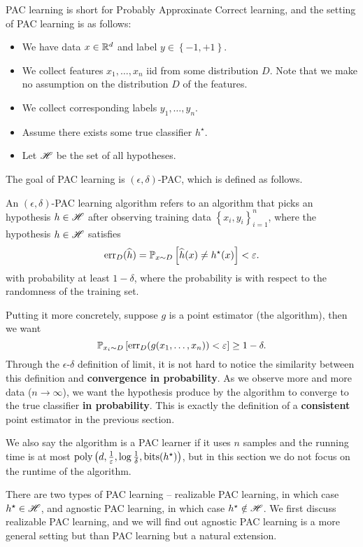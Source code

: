\documentclass[a4paper]{article}
\begin{document}
PAC learning is short for Probably Approxinate Correct 
learning, and the setting of PAC learning is as follows:
\begin{itemize}
  \item We have data $x \in \mathbb{R}^d$ and label $y \in \left\{ -1, 
  +1 \right\}$. 
  \item We collect features $x_1, \dots, x_n$ iid from 
  some distribution $D$. Note that we make no assumption on 
  the distribution $D$ of the features. 
  \item We collect corresponding labels $y_1, \dots, y_n$. 
  \item Assume there exists some true classifier $h^\star$.
  \item Let $\mathscr{H}$ be the set of all hypotheses.
\end{itemize}
The goal of PAC learning is $(\epsilon, \delta)$-PAC, 
which is defined as follows. 
\begin{defi}
  An $(\epsilon, \delta)$-PAC learning algorithm
  refers to an algorithm that 
  picks an hypothesis $h \in \mathscr{H}$  
  after observing training data 
  $\left\{ x_i, y_i \right\}_{i=1}^n$,
  where the hypothesis $h \in \mathscr{H}$ satisfies
  \[
  \operatorname{err}_D (\widehat{h}) = 
  \mathbb{P}_{x \sim D} \left[ \widehat{h}(x) \neq h^\star(x) \right]
  < \varepsilon.
  \]
  with probability at least $1 - \delta$, where the probability
  is with respect to the randomness of the training set.
\end{defi}
Putting it more concretely, suppose $g$ is a point estimator
(the algorithm), then we want 
\[
\mathbb{P}_{x_i \sim D} \left[ \operatorname{err}_D (g(x_1, \dots, x_n)) < \varepsilon 
\right] \geq 1 - \delta.
\]
Through the $\epsilon$-$\delta$ definition of limit, 
it is not hard to  
notice the similarity between this definition 
and \textbf{convergence in probability}.
As we observe more and more data ($n \to \infty$), 
we want the hypothesis 
produce by the algorithm to converge to the true classifier
\textbf{in probability}. This is exactly the definition 
of a \textbf{consistent} point estimator in the previous 
section.

We also say the algorithm is a PAC learner if it uses 
$n$ samples and the running time is at most $\operatorname{poly}
\left( d, \frac{1}{\varepsilon}, \log \frac{1}{\delta}, 
\operatorname{bits}(h^\star) \right)$, but in this section we do not 
focus on the runtime of the algorithm.

There are two types of PAC learning -- realizable PAC learning,
in which case $h^\star \in \mathscr{H}$, and agnostic PAC learning, 
in which case $h^\star \notin \mathscr{H}$. We first discuss 
realizable PAC learning, and we will find out agnostic PAC 
learning is a more general setting but than PAC learning
but a natural extension. 
\end{document}
